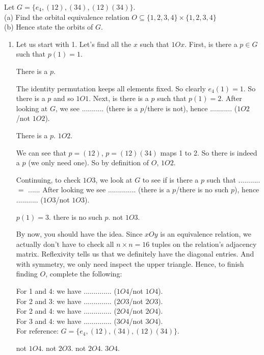 \begin{example}
Let $G = \{e_4, (12), (34), (12)(34)\}$. \\
(a) Find the orbital equivalence relation $O \subseteq \{1,2,3,4\} \times \{1,2,3,4\}$\\
(b) Hence state the orbits of $G$. 

\begin{enumerate}
\item Let us start with 1. Let's find all the $x$ such that $1Ox$. 
First, is there a $p \in G$ such that $p(1) = 1$.

 {There is a $p$.}

The identity permutation keeps all elements fixed. So clearly $e_4(1) = 1$. So there is a $p$ 
and so $1O1$. 
Next, is there is a $p$ such that $p(1) = 2$. 
After looking at $G$, we see ........... (there is a $p$/there is not), hence ........... ($1O2$/not $1O2$).

 {There is a $p$. $1O2$.}

We can see that $p = (12)$, $p = (12)(34)$ maps 1 to 2. So there is indeed a $p$ (we only need one). 
So by definition of $O$, $1O2$. 

Continuing, to check $1O3$, we look at $G$ to see if is there a $p$ such that ........... $=$ ...... 
After looking we see .............. (there is a $p$/there is no such $p$), hence ........... ($1O3$/not $1O3$).

 {$p(1) = 3$. there is no such $p$. not $1O3$.}

By now, you should have the idea. Since $xOy$ is an equivalence relation, 
we actually don't have to check all $n \times n = 16$ tuples on the 
relation's adjacency matrix. Reflexivity 
tells us that we definitely have the diagonal entries. And with symmetry,
we only need inspect the upper triangle.  Hence, to finish finding $O$, complete the following:

For 1 and 4: we have .............. ($1O4$/not $1O4$).\\
For 2 and 3: we have .............. ($2O3$/not $2O3$).\\
For 2 and 4: we have .............. ($2O4$/not $2O4$).\\
For 3 and 4: we have .............. ($3O4$/not $3O4$).\\
For reference: $G = \{e_4, (12), (34), (12)(34)\}$.

 {not $1O4$. not $2O3$. not $2O4$. $3O4$.}


\end{enumerate}
\end{example}
